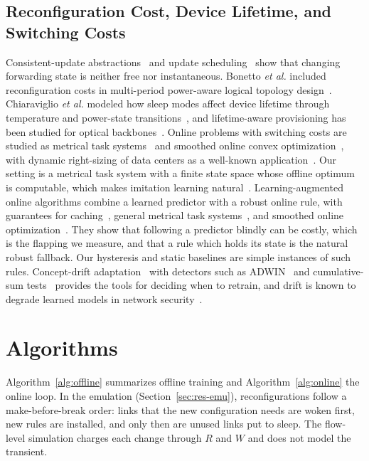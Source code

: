 \documentclass[preprint,12pt]{elsarticle}
\begin{document}
\subsection*{Reconfiguration Cost, Device Lifetime, and Switching Costs}

Consistent-update abstractions~\cite{reitblatt2012abstractions} and update scheduling~\cite{jin2014dionysus} show that changing forwarding state is neither free nor instantaneous. Bonetto \emph{et al.} included reconfiguration costs in multi-period power-aware logical topology design~\cite{bonetto2013multiperiod}. Chiaraviglio \emph{et al.} modeled how sleep modes affect device lifetime through temperature and power-state transitions~\cite{chiaraviglio2015lifetime,chiaraviglio2014impact}, and lifetime-aware provisioning has been studied for optical backbones~\cite{wiatr2016lifetime}. Online problems with switching costs are studied as metrical task systems~\cite{borodin1992mts} and smoothed online convex optimization~\cite{chen2018obd}, with dynamic right-sizing of data centers as a well-known application~\cite{lin2013rightsizing}. Our setting is a metrical task system with a finite state space whose offline optimum is computable, which makes imitation learning natural~\cite{ross2011dagger}. Learning-augmented online algorithms combine a learned predictor with a robust online rule, with guarantees for caching~\cite{lykouris2021caching}, general metrical task systems~\cite{antoniadis2023mts,christianson2023dart}, and smoothed online optimization~\cite{rutten2023smoothed}. They show that following a predictor blindly can be costly, which is the flapping we measure, and that a rule which holds its state is the natural robust fallback. Our hysteresis and static baselines are simple instances of such rules. Concept-drift adaptation~\cite{gama2014drift,lu2019drift} with detectors such as ADWIN~\cite{bifet2007adwin} and cumulative-sum tests~\cite{page1954cusum} provides the tools for deciding when to retrain, and drift is known to degrade learned models in network security~\cite{andresini2021insomnia}.



\section{Algorithms}\label{sec:algorithms}

Algorithm~\ref{alg:offline} summarizes offline training and Algorithm~\ref{alg:online} the online loop. In the emulation (Section~\ref{sec:res-emu}), reconfigurations follow a make-before-break order: links that the new configuration needs are woken first, new rules are installed, and only then are unused links put to sleep. The flow-level simulation charges each change through $R$ and $W$ and does not model the transient.
\end{document}

